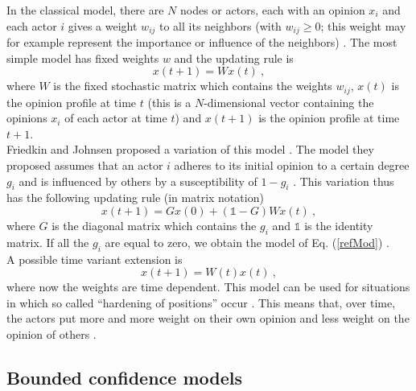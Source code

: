 \documentclass[11 pt , letterpaper , twoside , openright]{book}
\begin{document}
In the classical model, there are $N$ nodes or actors, each with an opinion $x_i$ and each actor $i$ gives a weight $w_{ij}$ to all its neighbors (with $w_{ij} \geqslant 0$; this weight may for example represent the importance or influence of the neighbors) \cite{Krause2002}. The most simple model has fixed weights $w$ and the updating rule is \cite{Krause2002}
\begin{equation}\label{refMod}
	x(t+1) = W x(t) \ ,
\end{equation}
where $W$ is the fixed stochastic matrix which contains the weights $w_{ij}$, $x(t)$ is the opinion profile at time $t$ (this is a $N$-dimensional vector containing the opinions $x_i$ of each actor at time $t$) and $x(t+1)$ is the opinion profile at time $t+1$.\\
\newline
Friedkin and Johnsen proposed a variation of this model \cite{Friedkin1990}\cite{Friedkin1999}. The model they proposed assumes that an actor $i$ adheres to its initial opinion to a certain degree $g_i$ and is influenced by others by a susceptibility of $1-g_i$ \cite{Krause2002}. This variation thus has the following updating rule (in matrix notation) \cite{Krause2002}
\begin{equation}
	x(t+1) = Gx(0) + (\mathbb{1}-G)Wx(t) \ ,
\end{equation}
where $G$ is the diagonal matrix which contains the $g_i$ and $\mathbb{1}$ is the identity matrix. If all the $g_i$ are equal to zero, we obtain the model of Eq. (\ref{refMod}) \cite{Krause2002}.\\
\newline
A possible time variant extension is \cite{Krause2002}
\begin{equation}
	x(t+1) = W(t)x(t) \ ,
\end{equation}
where now the weights are time dependent. This model can be used for situations in which so called ``hardening of positions'' occur \cite{Krause2002}. This means that, over time, the actors put more and more weight on their own opinion and less weight on the opinion of others \cite{Krause2002}. 

\subsection{Bounded confidence models}\label{bounded}
\end{document}
